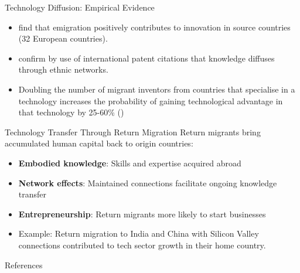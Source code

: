 \documentclass{beamer}
\begin{document}
\begin{frame}{Technology Diffusion: Empirical Evidence}
    \begin{itemize}
        \item \textcite{Fackler2020KnR} find that emigration positively contributes to innovation in source countries (32 European countries).
       \item \textcite{Kerr2008EtaI} confirm by use of international patent citations that knowledge diffuses through ethnic networks.
       \item Doubling the number of migrant inventors from countries that specialise in a technology increases the probability of gaining technological advantage in that technology by 25-60\% (\cite{Bahar2020MIT})
    \end{itemize}
\end{frame}

\begin{frame}{Technology Transfer Through Return Migration}
    Return migrants bring accumulated human capital back to origin countries:
    \begin{itemize}
        \item \textbf{Embodied knowledge}: Skills and expertise acquired abroad
        \item \textbf{Network effects}: Maintained connections facilitate ongoing knowledge transfer
        \item \textbf{Entrepreneurship}: Return migrants more likely to start businesses 
        \item Example: Return migration to India and China with Silicon Valley connections contributed to tech sector growth in their home country.
    \end{itemize}
\end{frame}


\begin{frame}[allowframebreaks]{References}
    \printbibliography
\end{frame}
\end{document}
